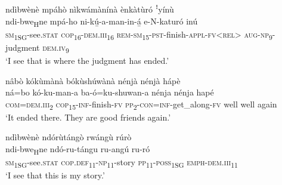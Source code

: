\newpage
ndìbwènè mpáhò nìkwámànínà ènkàtùró ꜝyínù \\
\gll ndi-bwe\textsubscript{H}ne    mpá-ho    ni-kú̲-a-man-in-á̲ e-N-katuró    inú \\
\textsc{sm}\textsubscript{1SG}{}-see.\textsc{stat}  \textsc{cop}\textsubscript{16}{}-\textsc{dem}.\textsc{iii}\textsubscript{16}  \textsc{rem}{}-\textsc{sm}\textsubscript{15}{}-\textsc{pst}{}-finish-\textsc{appl}{}-\textsc{fv}<\textsc{rel}>
\textsc{aug}{}-\textsc{np}\textsubscript{9}{}-judgment  \textsc{dem}.\textsc{iv}\textsubscript{9}\\
\glt ‘I see that is where the judgment has ended.’\bigskip

nâbò kókùmànà bókùshúwànà nénjà nénjà hápè\\
\gll ná=bo    kó-ku-man-a ba-ó=ku-shuwan-a      nénja  nénja  hapé \\
\textsc{com}=\textsc{dem}.\textsc{iii}\textsubscript{2} \textsc{cop}\textsubscript{15}{}-\textsc{inf}{}-finish-\textsc{fv}
\textsc{pp}\textsubscript{2}{}-\textsc{con}=\textsc{inf}{}-get\_along-\textsc{fv}  well  well  again\\
\glt ‘It ended there. They are good friends again.’\bigskip

ndìbwènè ndórùtángò rwángù rúrò\\
\gll ndi-bwe\textsubscript{H}ne    ndó-ru-tángu  ru-angú  ru-ró\\
\textsc{sm}\textsubscript{1SG}{}-see.\textsc{stat}  \textsc{cop}.\textsc{def}\textsubscript{11}{}-\textsc{np}\textsubscript{11}{}-story  \textsc{pp}\textsubscript{11}{}-\textsc{poss}\textsubscript{1SG}  \textsc{emph}{}-\textsc{dem}.\textsc{iii}\textsubscript{11}\\
\glt ‘I see that this is my story.’
